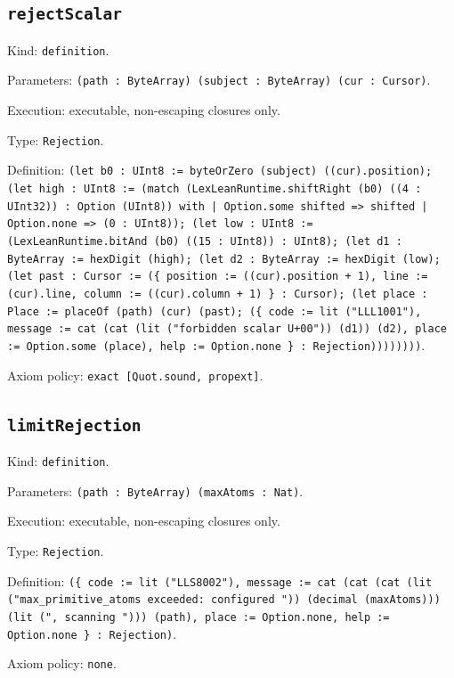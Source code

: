 \documentclass[11pt]{article}
\begin{document}
\subsection*{\texttt{rejectScalar}}
\noindent Kind: \texttt{definition}.\par
\noindent Parameters: \texttt{(path : ByteArray) (subject : ByteArray) (cur : Cursor)}.\par
\noindent Execution: executable, non-escaping closures only.\par
\noindent Type: \texttt{Rejection}.\par
\noindent Definition: \texttt{(let b0 : UInt8 := byteOrZero (subject) ((cur).position); (let high : UInt8 := (match (LexLeanRuntime.shiftRight (b0) ((4 : UInt32)) : Option (UInt8)) with | Option.some shifted => shifted | Option.none => (0 : UInt8)); (let low : UInt8 := (LexLeanRuntime.bitAnd (b0) ((15 : UInt8)) : UInt8); (let d1 : ByteArray := hexDigit (high); (let d2 : ByteArray := hexDigit (low); (let past : Cursor := (\{ position := ((cur).position + 1), line := (cur).line, column := ((cur).column + 1) \} : Cursor); (let place : Place := placeOf (path) (cur) (past); (\{ code := lit ("LLL1001"), message := cat (cat (lit ("forbidden scalar U+00")) (d1)) (d2), place := Option.some (place), help := Option.none \} : Rejection))))))))}.\par
\noindent Axiom policy: \texttt{exact [Quot.sound, propext]}.\par
\subsection*{\texttt{limitRejection}}
\noindent Kind: \texttt{definition}.\par
\noindent Parameters: \texttt{(path : ByteArray) (maxAtoms : Nat)}.\par
\noindent Execution: executable, non-escaping closures only.\par
\noindent Type: \texttt{Rejection}.\par
\noindent Definition: \texttt{(\{ code := lit ("LLS8002"), message := cat (cat (cat (lit ("max\_primitive\_atoms exceeded: configured ")) (decimal (maxAtoms))) (lit (", scanning "))) (path), place := Option.none, help := Option.none \} : Rejection)}.\par
\noindent Axiom policy: \texttt{none}.\par
\end{document}
